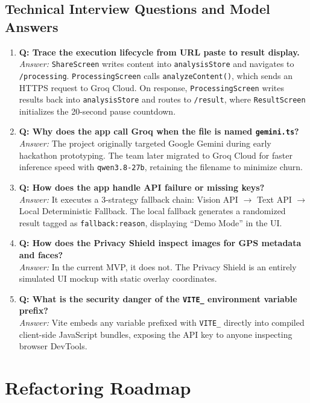 \documentclass[10pt,a4paper]{report}
\begin{document}
\section{Technical Interview Questions and Model Answers}
\begin{enumerate}[leftmargin=1.5em]
    \item \textbf{Q: Trace the execution lifecycle from URL paste to result display.} \\
    \textit{Answer:} \texttt{ShareScreen} writes content into \texttt{analysisStore} and navigates to \texttt{/processing}. \texttt{ProcessingScreen} calls \texttt{analyzeContent()}, which sends an HTTPS request to Groq Cloud. On response, \texttt{ProcessingScreen} writes results back into \texttt{analysisStore} and routes to \texttt{/result}, where \texttt{ResultScreen} initializes the 20-second pause countdown.
    \item \textbf{Q: Why does the app call Groq when the file is named \texttt{gemini.ts}?} \\
    \textit{Answer:} The project originally targeted Google Gemini during early hackathon prototyping. The team later migrated to Groq Cloud for faster inference speed with \texttt{qwen3.8-27b}, retaining the filename to minimize churn.
    \item \textbf{Q: How does the app handle API failure or missing keys?} \\
    \textit{Answer:} It executes a 3-strategy fallback chain: Vision API $\rightarrow$ Text API $\rightarrow$ Local Deterministic Fallback. The local fallback generates a randomized result tagged as \texttt{fallback:reason}, displaying ``Demo Mode'' in the UI.
    \item \textbf{Q: How does the Privacy Shield inspect images for GPS metadata and faces?} \\
    \textit{Answer:} In the current MVP, it does not. The Privacy Shield is an entirely simulated UI mockup with static overlay coordinates.
    \item \textbf{Q: What is the security danger of the \texttt{VITE\_} environment variable prefix?} \\
    \textit{Answer:} Vite embeds any variable prefixed with \texttt{VITE\_} directly into compiled client-side JavaScript bundles, exposing the API key to anyone inspecting browser DevTools.
\end{enumerate}

\chapter{Refactoring Roadmap}
\end{document}
